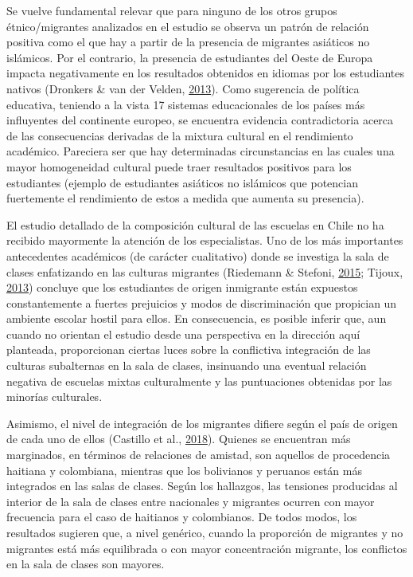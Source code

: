 \documentclass[
]{article}
\begin{document}
Se vuelve fundamental relevar que para ninguno de los otros grupos
étnico/migrantes analizados en el estudio se observa un patrón de
relación positiva como el que hay a partir de la presencia de migrantes
asiáticos no islámicos. Por el contrario, la presencia de estudiantes
del Oeste de Europa impacta negativamente en los resultados obtenidos en
idiomas por los estudiantes nativos (Dronkers \& van der Velden,
\protect\hyperlink{ref-dronkers_positive_2013a}{2013}). Como sugerencia
de política educativa, teniendo a la vista 17 sistemas educacionales de
los países más influyentes del continente europeo, se encuentra
evidencia contradictoria acerca de las consecuencias derivadas de la
mixtura cultural en el rendimiento académico. Pareciera ser que hay
determinadas circunstancias en las cuales una mayor homogeneidad
cultural puede traer resultados positivos para los estudiantes (ejemplo
de estudiantes asiáticos no islámicos que potencian fuertemente el
rendimiento de estos a medida que aumenta su presencia).

El estudio detallado de la composición cultural de las escuelas en Chile
no ha recibido mayormente la atención de los especialistas. Uno de los
más importantes antecedentes académicos (de carácter cualitativo) donde
se investiga la sala de clases enfatizando en las culturas migrantes
(Riedemann \& Stefoni,
\protect\hyperlink{ref-riedemann_sobre_2015}{2015}; Tijoux,
\protect\hyperlink{ref-tijoux_escuelas_2013}{2013}) concluye que los
estudiantes de origen inmigrante están expuestos constantemente a
fuertes prejuicios y modos de discriminación que propician un ambiente
escolar hostil para ellos. En consecuencia, es posible inferir que, aun
cuando no orientan el estudio desde una perspectiva en la dirección aquí
planteada, proporcionan ciertas luces sobre la conflictiva integración
de las culturas subalternas en la sala de clases, insinuando una
eventual relación negativa de escuelas mixtas culturalmente y las
puntuaciones obtenidas por las minorías culturales.

Asimismo, el nivel de integración de los migrantes difiere según el país
de origen de cada uno de ellos (Castillo et al.,
\protect\hyperlink{ref-castillo_estudiantes_2018}{2018}). Quienes se
encuentran más marginados, en términos de relaciones de amistad, son
aquellos de procedencia haitiana y colombiana, mientras que los
bolivianos y peruanos están más integrados en las salas de clases. Según
los hallazgos, las tensiones producidas al interior de la sala de clases
entre nacionales y migrantes ocurren con mayor frecuencia para el caso
de haitianos y colombianos. De todos modos, los resultados sugieren que,
a nivel genérico, cuando la proporción de migrantes y no migrantes está
más equilibrada o con mayor concentración migrante, los conflictos en la
sala de clases son mayores.
\end{document}
